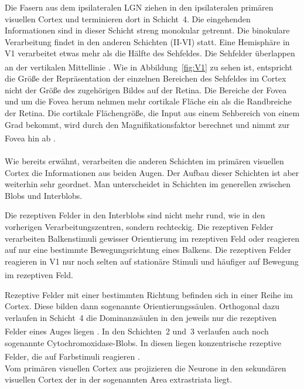 \documentclass[12pt,a4paper,pdftex]{article}
\begin{document}
Die Fasern aus dem ipsilateralen LGN ziehen in den ipsilateralen primären visuellen Cortex und terminieren dort in Schicht~4. Die eingehenden Informationen sind in dieser Schicht streng monokular getrennt. Die binokulare Verarbeitung findet in den anderen Schichten (II-VI) statt. Eine Hemisphäre in V1 verarbeitet etwas mehr als die Hälfte des Sehfeldes. Die Sehfelder überlappen an der vertikalen Mittellinie \textsuperscript{\cite[25]{kandel2013principles}}.
Wie in Abbildung~\ref{fig:V1} zu sehen ist, entspricht die Größe der Repräsentation der einzelnen Bereichen des Sehfeldes im Cortex nicht der Größe des zugehörigen Bildes auf der Retina. Die Bereiche der Fovea und um die Fovea herum nehmen mehr cortikale Fläche ein als die Randbreiche der Retina. Die cortikale Flächengröße, die Input aus einem Sehbereich von einem Grad bekommt, wird durch den Magnifikationsfaktor berechnet und nimmt zur Fovea hin ab \textsuperscript{\cite[25]{kandel2013principles}}.
\\
\\
\noindent Wie bereits erwähnt, verarbeiten die anderen Schichten im primären visuellen Cortex die Informationen aus beiden Augen. Der Aufbau dieser Schichten ist aber weiterhin sehr geordnet. Man unterscheidet in Schichten im generellen zwischen Blobs und Interblobs.

Die rezeptiven Felder in den Interblobs sind nicht mehr rund, wie in den vorherigen Verarbeitungszentren, sondern rechteckig. Die rezeptiven Felder verarbeiten Balkenstimuli gewisser Orientierung im rezeptiven Feld oder reagieren auf nur eine bestimmte Bewegungsrichtung eines Balkens. Die rezeptiven Felder reagieren in V1 nur noch selten auf stationäre Stimuli und häufiger auf Bewegung im rezeptiven Feld. \textsuperscript{\cite[18]{smith2008biology}}

Rezeptive Felder mit einer bestimmten Richtung befinden sich in einer Reihe im Cortex. Diese bilden dann sogenannte Orientierungssäulen. Orthogonal dazu verlaufen in Schicht~4 die Dominanzsäulen in den jeweils nur die rezeptiven Felder eines Auges liegen \textsuperscript{\cite[10]{neurowissenschaften_baer}}.
In den Schichten~2 und~3 verlaufen auch noch sogenannte Cytochromoxidase-Blobs. In diesen liegen konzentrische rezeptive Felder, die auf Farbstimuli reagieren \textsuperscript{\cite[18]{smith2008biology}}.\\

\noindent Vom primären visuellen Cortex aus projizieren die Neurone in den sekundären visuellen Cortex der in der sogenannten Area extrastriata liegt. 
\end{document}
